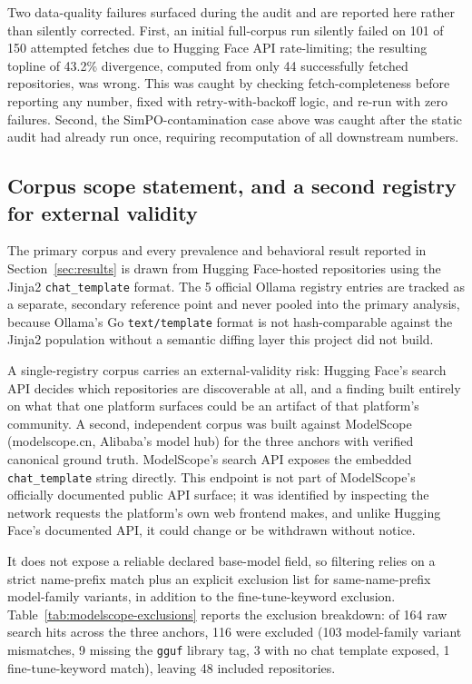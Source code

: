 \documentclass[letterpaper,twocolumn,10pt]{article}
\begin{document}
Two data-quality failures surfaced during the audit and are reported here rather than silently corrected. First, an initial full-corpus run silently failed on 101 of 150 attempted fetches due to Hugging Face API rate-limiting; the resulting topline of 43.2\% divergence, computed from only 44 successfully fetched repositories, was wrong. This was caught by checking fetch-completeness before reporting any number, fixed with retry-with-backoff logic, and re-run with zero failures. Second, the SimPO-contamination case above was caught after the static audit had already run once, requiring recomputation of all downstream numbers.

\subsection{Corpus scope statement, and a second registry for external validity}
\label{sec:corpus-scope}

The primary corpus and every prevalence and behavioral result reported in Section~\ref{sec:results} is drawn from Hugging Face-hosted repositories using the Jinja2 \texttt{chat\_template} format. The 5 official Ollama registry entries are tracked as a separate, secondary reference point and never pooled into the primary analysis, because Ollama's Go \texttt{text/template} format is not hash-comparable against the Jinja2 population without a semantic diffing layer this project did not build.

A single-registry corpus carries an external-validity risk: Hugging Face's search API decides which repositories are discoverable at all, and a finding built entirely on what that one platform surfaces could be an artifact of that platform's community. A second, independent corpus was built against ModelScope (modelscope.cn, Alibaba's model hub) for the three anchors with verified canonical ground truth. ModelScope's search API exposes the embedded \texttt{chat\_template} string directly. This endpoint is not part of ModelScope's officially documented public API surface; it was identified by inspecting the network requests the platform's own web frontend makes, and unlike Hugging Face's documented API, it could change or be withdrawn without notice.

It does not expose a reliable declared base-model field, so filtering relies on a strict name-prefix match plus an explicit exclusion list for same-name-prefix model-family variants, in addition to the fine-tune-keyword exclusion. Table~\ref{tab:modelscope-exclusions} reports the exclusion breakdown: of 164 raw search hits across the three anchors, 116 were excluded (103 model-family variant mismatches, 9 missing the \texttt{gguf} library tag, 3 with no chat template exposed, 1 fine-tune-keyword match), leaving 48 included repositories.
\end{document}
